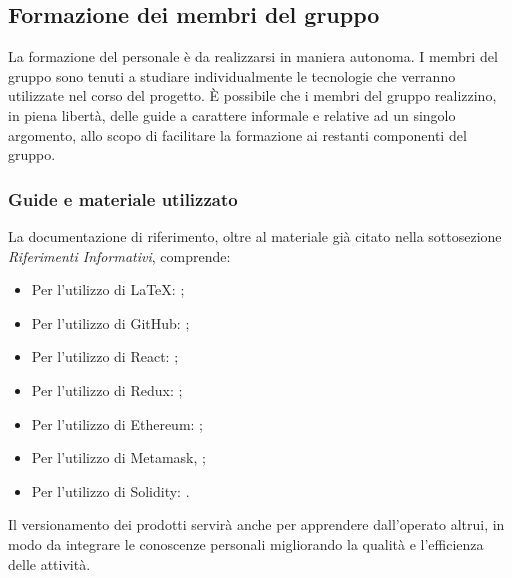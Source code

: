 \documentclass[NormeDiProgetto.tex]{subfiles}
\begin{document}
	\subsection{Formazione dei membri del gruppo}
		La formazione del personale è da realizzarsi in maniera autonoma. I membri del gruppo \gruppo sono tenuti a studiare individualmente le tecnologie che verranno utilizzate nel corso del progetto. \`{E} possibile che i membri del gruppo realizzino, in piena libertà, delle guide a carattere informale e relative ad un singolo argomento, allo scopo di facilitare la formazione ai restanti componenti del gruppo.

	\subsubsection{Guide e materiale utilizzato}
	 La documentazione di riferimento, oltre al materiale già citato nella sottosezione \emph{Riferimenti Informativi}, comprende:\\
	\begin{itemize}
		\item Per l'utilizzo di \LaTeX: ;\\
		\item Per l'utilizzo di GitHub: ;\\
		\item Per l'utilizzo di React: ;\\
		\item Per l'utilizzo di Redux: ;\\
		\item Per l'utilizzo di Ethereum: ;\\
		\item Per l'utilizzo di Metamask, ;\\ 
		\item Per l'utilizzo di Solidity: .\\
	\end{itemize}
	Il versionamento dei prodotti servirà anche per apprendere dall'operato
	altrui, in modo da integrare le conoscenze personali migliorando la qualità e
	l'efficienza delle attività.
	
\end{document}
